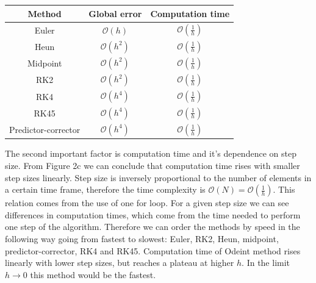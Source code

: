 \documentclass[12pt, a4paper]{article}
\begin{document}
\begin{center}
  \begin{tabular}{ c c c }
   Method & Global error & Computation time \\
   \hline 
   Euler & $\mathcal{O}(h)$ & $\mathcal{O}(\frac{1}{h})$ \\  
   Heun & $\mathcal{O}(h^2)$ & $\mathcal{O}(\frac{1}{h})$ \\  
   Midpoint & $\mathcal{O}(h^2)$ & $\mathcal{O}(\frac{1}{h})$ \\  
   RK2 & $\mathcal{O}(h^2)$ & $\mathcal{O}(\frac{1}{h})$ \\  
   RK4 & $\mathcal{O}(h^4)$ & $\mathcal{O}(\frac{1}{h})$ \\  
   RK45 & $\mathcal{O}(h^4)$ & $\mathcal{O}(\frac{1}{h})$ \\  
   Predictor-corrector & $\mathcal{O}(h^4)$ & $\mathcal{O}(\frac{1}{h})$
  \end{tabular}
  \end{center}

The second important factor is computation time and it's dependence on step size. From Figure 2c we can conclude that computation time rises with smaller step sizes linearly. Step size is inversely proportional to the number of elements in a certain time frame, therefore the time complexity is $\mathcal{O}(N) = \mathcal{O}(\frac{1}{h})$. This relation comes from the use of one for loop. For a given step size we can see differences in computation times, which come from the time needed to perform one step of the algorithm. Therefore we can order the methods by speed in the following way going from fastest to slowest: Euler, RK2, Heun, midpoint, predictor-corrector, RK4 and RK45. Computation time of Odeint method rises linearly with lower step sizes, but reaches a plateau at higher $h$. In the limit $h \rightarrow 0$ this method would be the fastest. 
\end{document}

